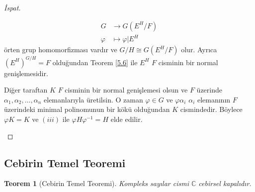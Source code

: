 \documentclass{article}
\newtheorem{thm}{Teorem}[section]
\theoremstyle{definition}
\theoremstyle{remark}
\begin{document}
\begin{proof}[İspat]
\begin{enumerate}
    			    \begin{align*}
    			        G &\to G(E^H/F)\\
    			        \varphi &\mapsto \varphi|E^H
    			    \end{align*}
    			    örten grup homomorfizması vardır ve $G/H \cong G(E^H/F)$ olur. Ayrıca $(E^H)^{G/H} = F$ olduğundan Teorem \ref{5.6} ile $E^H$ $F$ cisminin bir normal genişlemesidir.\par
    			    Diğer taraftan $K$ $F$ cisminin bir normal genişlemesi olsun ve $F$ üzerinde $\alpha_1, \alpha_2, \dots, \alpha_n$ elemanlarıyla üretilsin. O zaman $\varphi \in G$ ve $\varphi \alpha_i$ $\alpha_i$ elemanının $F$ üzerindeki minimal polinomunun bir kökü olduğundan $K$ cismindedir. Böylece $\varphi K = K$ ve $(iii)$ ile $\varphi H \varphi^{-1} = H$ elde edilir.
    			\end{enumerate}
    	    \end{proof}
    	    
    	\subsection{Cebirin Temel Teoremi}
    	
    	    \begin{thm}[Cebirin Temel Teoremi]
    	        Kompleks sayılar cismi $\mathbb{C}$ cebirsel kapalıdır.
    	    \end{thm}
    	    
\end{document}
